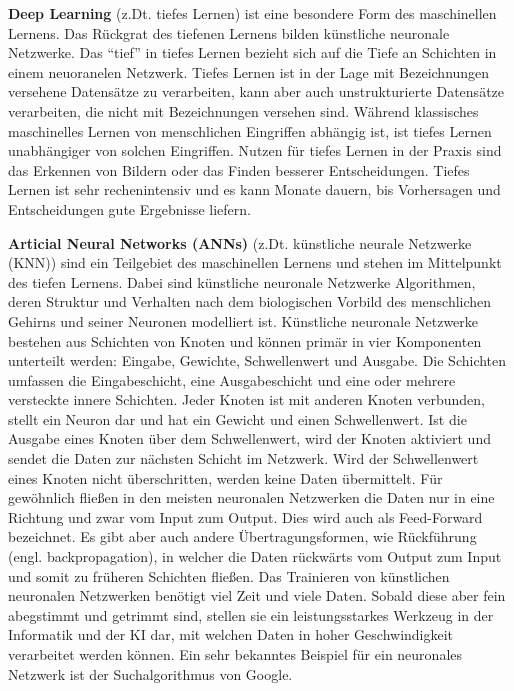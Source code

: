 \textbf{Deep Learning} (z.Dt. tiefes Lernen) ist eine besondere Form des maschinellen Lernens.
Das Rückgrat des tiefenen Lernens bilden künstliche neuronale Netzwerke.
Das \enquote{tief} in tiefes Lernen bezieht sich auf die Tiefe an Schichten in einem neuoranelen Netzwerk.
Tiefes Lernen ist in der Lage mit Bezeichnungen versehene Datensätze zu verarbeiten, kann aber auch unstrukturierte Datensätze verarbeiten, die nicht mit Bezeichnungen versehen sind.
Während klassisches maschinelles Lernen von menschlichen Eingriffen abhängig ist, ist tiefes Lernen unabhängiger von solchen Eingriffen.
Nutzen für tiefes Lernen in der Praxis sind das Erkennen von Bildern oder das Finden besserer Entscheidungen.
Tiefes Lernen ist sehr rechenintensiv und es kann Monate dauern, bis Vorhersagen und Entscheidungen gute Ergebnisse liefern.

\textbf{Articial Neural Networks (ANNs)} (z.Dt. künstliche neurale Netzwerke (KNN)) sind ein Teilgebiet des maschinellen Lernens und stehen im Mittelpunkt des tiefen Lernens.
Dabei sind künstliche neuronale Netzwerke Algorithmen, deren Struktur und Verhalten nach dem biologischen Vorbild des menschlichen Gehirns und seiner Neuronen modelliert ist.
Künstliche neuronale Netzwerke bestehen aus Schichten von Knoten und können primär in vier Komponenten unterteilt werden: Eingabe, Gewichte, Schwellenwert und Ausgabe.
Die Schichten umfassen die Eingabeschicht, eine Ausgabeschicht und eine oder mehrere versteckte innere Schichten.
Jeder Knoten ist mit anderen Knoten verbunden, stellt ein Neuron dar und hat ein Gewicht und einen Schwellenwert.
Ist die Ausgabe eines Knoten über dem Schwellenwert, wird der Knoten aktiviert und sendet die Daten zur nächsten Schicht im Netzwerk.
Wird der Schwellenwert eines Knoten nicht überschritten, werden keine Daten übermittelt.
Für gewöhnlich fließen in den meisten neuronalen Netzwerken die Daten nur in eine Richtung und zwar vom Input zum Output.
Dies wird auch als Feed-Forward bezeichnet.
Es gibt aber auch andere Übertragungsformen, wie Rückführung (engl. backpropagation), in welcher die Daten rückwärts vom Output zum Input und somit zu früheren Schichten fließen.
Das Trainieren von künstlichen neuronalen Netzwerken benötigt viel Zeit und viele Daten.
Sobald diese aber fein abegstimmt und getrimmt sind, stellen sie ein leistungsstarkes Werkzeug in der Informatik und der KI dar, mit welchen Daten in hoher Geschwindigkeit verarbeitet werden können.
Ein sehr bekanntes Beispiel für ein neuronales Netzwerk ist der Suchalgorithmus von Google.

